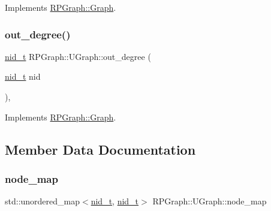 Implements \mbox{\hyperlink{classRPGraph_1_1Graph_ab5602e6b776a0ea3b944775331fcb2aa}{R\+P\+Graph\+::\+Graph}}.

\mbox{\label{classRPGraph_1_1UGraph_a8416a5fa8b87b8569d0fa563288ac162}} 
\subsubsection{\texorpdfstring{out\+\_\+degree()}{out\_degree()}}
{\footnotesize\ttfamily \mbox{\hyperlink{namespaceRPGraph_ab3ae34f1ab88e48f43794c30c8697b74}{nid\+\_\+t}} R\+P\+Graph\+::\+U\+Graph\+::out\+\_\+degree (\begin{DoxyParamCaption}\item[{\mbox{\hyperlink{namespaceRPGraph_ab3ae34f1ab88e48f43794c30c8697b74}{nid\+\_\+t}}}]{nid }\end{DoxyParamCaption})\hspace{0.3cm}{\ttfamily [override]}, {\ttfamily [virtual]}}



Implements \mbox{\hyperlink{classRPGraph_1_1Graph_a660ad58e03df7e3cc00d0eb4e5c16819}{R\+P\+Graph\+::\+Graph}}.



\subsection{Member Data Documentation}
\mbox{\label{classRPGraph_1_1UGraph_a084f2f04bcf93eb362fbf1d275a1c018}} 
\subsubsection{\texorpdfstring{node\+\_\+map}{node\_map}}
{\footnotesize\ttfamily std\+::unordered\+\_\+map$<$\mbox{\hyperlink{namespaceRPGraph_ab3ae34f1ab88e48f43794c30c8697b74}{nid\+\_\+t}}, \mbox{\hyperlink{namespaceRPGraph_ab3ae34f1ab88e48f43794c30c8697b74}{nid\+\_\+t}}$>$ R\+P\+Graph\+::\+U\+Graph\+::node\+\_\+map}

\mbox{\label{classRPGraph_1_1UGraph_a688250d7d12a6a901325a4ee7b3b518d}} 
